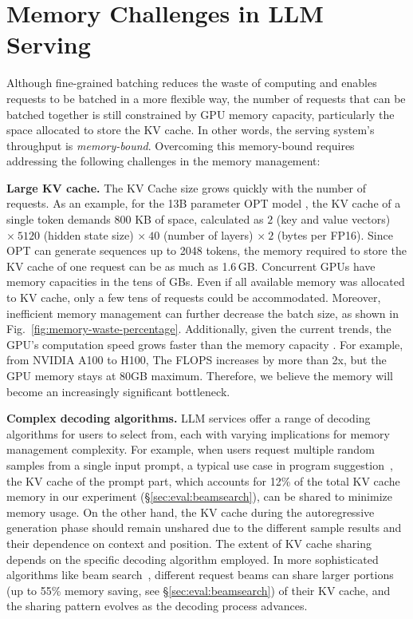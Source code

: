 \documentclass[sigplan,10pt]{acmart}
\newcommand{\heading}[1]{\vspace{4pt}\noindent\textbf{#1}}
\begin{document}
\section{Memory Challenges in LLM Serving}

\label{sec:motivation}

Although fine-grained batching reduces the waste of computing and enables requests to be batched in a more flexible way,
the number of requests that can be batched together is still constrained by GPU memory capacity, particularly the space allocated to store the KV cache. 
In other words, the serving system's throughput is \emph{memory-bound}.
Overcoming this memory-bound requires addressing the following challenges in the memory management:

\heading{Large KV cache.} The KV Cache size grows quickly with the number of requests. As an example, for the 13B parameter OPT model \cite{zhang2022opt}, the KV cache of a single token demands 800 KB of space, calculated as $2$ (key and value vectors) $\times\  5120$ (hidden state size) $\times \  40$ (number of layers) $\times \  2$ (bytes per FP16). Since OPT can generate sequences up to 2048 tokens, the memory required to store the KV cache of one request can be as much as 1.6\,GB. Concurrent GPUs have memory capacities in the tens of GBs. Even if all available memory was allocated to KV cache, only a few tens of requests could be accommodated. Moreover, inefficient memory management can further decrease the batch size, as shown in Fig.~\ref{fig:memory-waste-percentage}. 
Additionally, given the current trends, the GPU's computation speed grows faster than the memory capacity \cite{gholami2021ai}. For example, from NVIDIA A100 to H100, The FLOPS increases by more than 2x, but the GPU memory stays at 80GB maximum. Therefore, we believe the memory will become an increasingly significant bottleneck.


\heading{Complex decoding algorithms.} 
LLM services offer a range of decoding algorithms for users to select from, each with varying implications for memory management complexity. For example, when users request multiple random samples from a single input prompt, a typical use case in program suggestion~\cite{copilot}, the KV cache of the prompt part, which accounts for 12\% of the total KV cache memory in our experiment (\S\ref{sec:eval:beamsearch}), can be shared to minimize memory usage. On the other hand, the KV cache during the autoregressive generation phase should remain unshared due to the different sample results and their dependence on context and position.
The extent of KV cache sharing depends on the specific decoding algorithm employed. In more sophisticated algorithms like beam search~\cite{sutskever2014sequence}, different request beams can share larger portions (up to 55\% memory saving, see \S\ref{sec:eval:beamsearch}) of their KV cache, and the sharing pattern evolves as the decoding process advances. 
\end{document}
